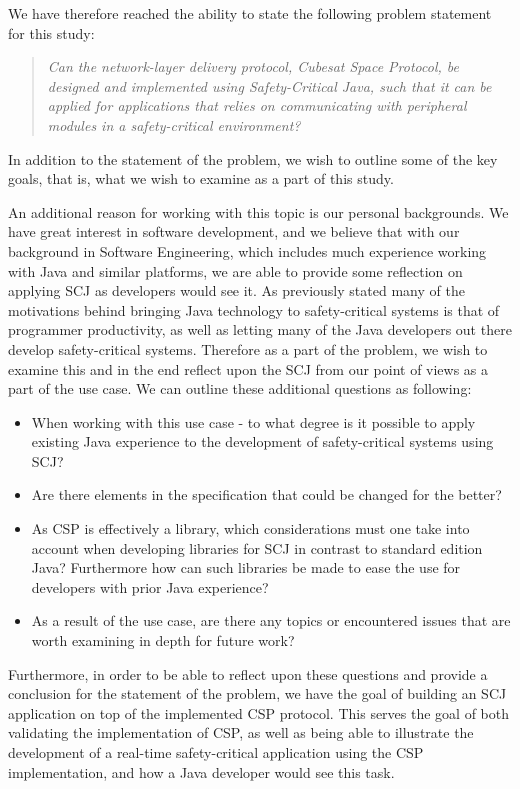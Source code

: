 We have therefore reached the ability to state the following problem statement for this study:
\begin{quotation}
	\textit{Can the network-layer delivery protocol, Cubesat Space Protocol, be designed and implemented using Safety-Critical Java, such that it can be applied for applications that relies on communicating with peripheral modules in a safety-critical environment?}
\end{quotation}
In addition to the statement of the problem, we wish to outline some of the key goals, that is, what we wish to examine as a part of this study.

An additional reason for working with this topic is our personal backgrounds. We have great interest in software development, and we believe that with our background in Software Engineering, which includes much experience working with Java and similar platforms, we are able to provide some reflection on applying SCJ as developers would see it. As previously stated many of the motivations behind bringing Java technology to safety-critical systems is that of programmer productivity, as well as letting many of the Java developers out there develop safety-critical systems. Therefore as a part of the problem, we wish to examine this and in the end reflect upon the SCJ from our point of views as a part of the use case. We can outline these additional questions as following:
\begin{itemize}
	\item When working with this use case - to what degree is it possible to apply existing Java experience to the development of safety-critical systems using SCJ?
	\item Are there elements in the specification that could be changed for the better?
	\item As CSP is effectively a library, which considerations must one take into account when developing libraries for SCJ in contrast to standard edition Java? Furthermore how can such libraries be made to ease the use for developers with prior Java experience?
	\item As a result of the use case, are there any topics or encountered issues that are worth examining in depth for future work?
\end{itemize}

Furthermore, in order to be able to reflect upon these questions and provide a conclusion for the statement of the problem, we have the goal of building an SCJ application on top of the implemented CSP protocol. This serves the goal of both 
validating the implementation of CSP, as well as being able to illustrate the development of a real-time safety-critical application using the CSP implementation, and how a Java developer would see this task.




